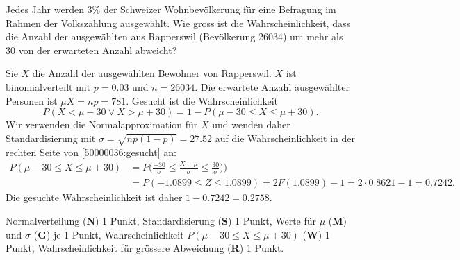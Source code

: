 Jedes Jahr werden 3\% der Schweizer Wohnbevölkerung für eine Befragung
im Rahmen der Volks\-zählung ausgewählt.
Wie gross ist die Wahrscheinlichkeit, dass die Anzahl der ausgewählten
aus Rapperswil (Bevölkerung 26034) um mehr als 30 von der erwarteten
Anzahl abweicht?


\begin{loesung}
Sie $X$ die Anzahl der ausgewählten Bewohner von Rapperswil.
$X$ ist binomialverteilt mit $p=0.03$ und $n=26034$.
Die erwartete Anzahl ausgewählter Personen ist $\mu X=np=781$.
Gesucht ist die Wahrscheinlichkeit
\begin{equation}
P(X < \mu - 30 \vee X > \mu + 30)
=
1-P(\mu - 30 \le X \le \mu + 30).
\label{50000036:gesucht}
\end{equation}
Wir verwenden die Normalapproximation für $X$ und wenden daher
Standardisierung mit $\sigma=\sqrt{np(1-p)}=27.52$ auf
die Wahrscheinlichkeit in der rechten Seite von
\eqref{50000036:gesucht}
an:
\begin{align*}
P(\mu - 30 \le X \le \mu + 30)
&=
P\biggl(
\frac{-30}{\sigma} \le \frac{X-\mu}{\sigma} \le \frac{30}{\sigma})
\biggr)
\\
&=
P(-1.0899 \le Z \le 1.0899)
=
2F(1.0899)-1
=
2\cdot 0.8621 - 1
=
0.7242.
\end{align*}
Die gesuchte Wahrscheinlichkeit ist daher $1-0.7242= 0.2758$.
\end{loesung}

\begin{bewertung}
Normalverteilung ({\bf N}) 1 Punkt,
Standardisierung ({\bf S}) 1 Punkt,
Werte für $\mu$ ({\bf M}) und $\sigma$ ({\bf G}) je 1 Punkt,
Wahrscheinlichkeit $P(\mu-30\le X\le \mu+30)$ ({\bf W}) 1 Punkt,
Wahrscheinlichkeit für grössere Abweichung ({\bf R}) 1 Punkt.
\end{bewertung}
